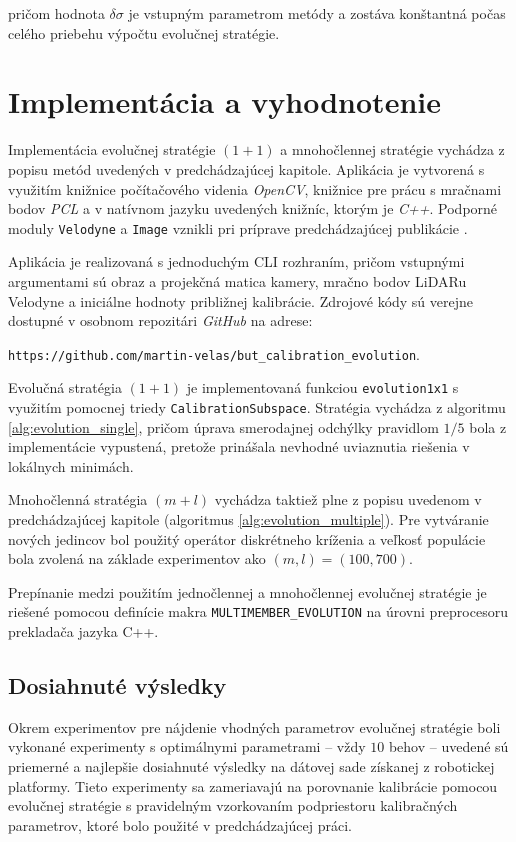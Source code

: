 \documentclass[12pt, a4paper]{article}
\begin{document}
pričom hodnota $\delta\sigma$ je vstupným parametrom metódy a zostáva konštantná počas celého priebehu výpočtu evolučnej stratégie.

\section{Implementácia a vyhodnotenie}

Implementácia evolučnej stratégie $(1+1)$ a mnohočlennej stratégie vychádza z popisu metód uvedených v predchádzajúcej kapitole. Aplikácia je vytvorená s využitím knižnice počítačového videnia \emph{OpenCV}, knižnice pre prácu s mračnami bodov \emph{PCL} a v natívnom jazyku uvedených knižníc, ktorým je \emph{C++}. Podporné moduly \texttt{Velodyne} a \texttt{Image} vznikli pri príprave predchádzajúcej publikácie \cite{velas}.

Aplikácia je realizovaná s jednoduchým CLI rozhraním, pričom vstupnými argumentami sú obraz a projekčná matica kamery, mračno bodov LiDARu Velodyne a iniciálne hodnoty približnej kalibrácie. Zdrojové kódy sú verejne dostupné v osobnom repozitári \emph{GitHub} na adrese: 

\texttt{https://github.com/martin-velas/but\_calibration\_evolution}.

\medskip
Evolučná stratégia $(1+1)$ je implementovaná funkciou \texttt{evolution1x1} s využitím pomocnej triedy \texttt{CalibrationSubspace}. Stratégia vychádza z algoritmu \ref{alg:evolution_single}, pričom úprava smerodajnej odchýlky pravidlom $1/5$ bola z implementácie vypustená, pretože prinášala nevhodné uviaznutia riešenia v lokálnych minimách.

Mnohočlenná stratégia $(m+l)$ vychádza taktiež plne z popisu uvedenom v predchádzajúcej kapitole (algoritmus \ref{alg:evolution_multiple}). Pre vytváranie nových jedincov bol použitý operátor diskrétneho kríženia a veľkosť populácie bola zvolená na základe experimentov ako $(m,l) = (100,700)$.

Prepínanie medzi použitím jednočlennej a mnohočlennej evolučnej stratégie je riešené pomocou definície makra \texttt{MULTIMEMBER\_EVOLUTION} na úrovni preprocesoru prekladača jazyka C++.

\subsection{Dosiahnuté výsledky}
Okrem experimentov pre nájdenie vhodných parametrov evolučnej stratégie boli vykonané experimenty s optimálnymi parametrami -- vždy $10$ behov -- uvedené sú priemerné a najlepšie dosiahnuté výsledky na dátovej sade získanej z robotickej platformy. Tieto experimenty sa zameriavajú na porovnanie kalibrácie pomocou evolučnej stratégie s pravidelným vzorkovaním podpriestoru kalibračných parametrov, ktoré bolo použité v predchádzajúcej práci. 
\end{document}
